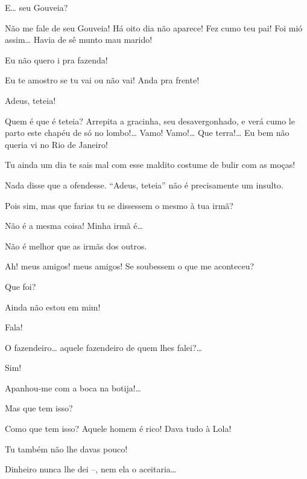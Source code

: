  E\ldots{} seu Gouveia?

 Não me fale de seu Gouveia! Há oito dia não aparece! Fez cumo
teu pai! Foi mió assim\ldots{} Havia de sê munto mau marido!

 Eu não quero i pra fazenda!

 Eu te amostro se tu vai ou não vai! Anda pra frente! 

  Adeus, teteia!

 Quem é que é teteia? Arrepita a gracinha, seu desavergonhado, e
verá cumo le parto este chapéu de só no lombo!\ldots{}  Vamo! Vamo!\ldots{}
Que terra!\ldots{} Eu bem não queria vi no Rio de Janeiro! 


 Tu ainda um dia te sais mal com esse maldito costume de bulir
com as moças!

 Nada disse que a ofendesse. “Adeus, teteia” não é
precisamente um insulto.

 Pois sim, mas que farias tu se dissessem o mesmo à tua irmã?

 Não é a mesma coisa! Minha irmã é\ldots{}

 Não é melhor que as irmãs dos outros. 

 Ah! meus amigos! meus amigos! Se soubessem o que me aconteceu?

 Que foi?

 Ainda não estou em mim!

 Fala!

 O fazendeiro\ldots{} aquele fazendeiro de quem lhes falei?\ldots{}

 Sim!

 Apanhou-me com a boca na botija!\ldots{}

 Mas que tem isso?

 Como que tem isso? Aquele homem é rico! Dava tudo à Lola!

 Tu também não lhe davas pouco!

  Dinheiro nunca lhe dei --, nem ela o aceitaria\ldots{}

